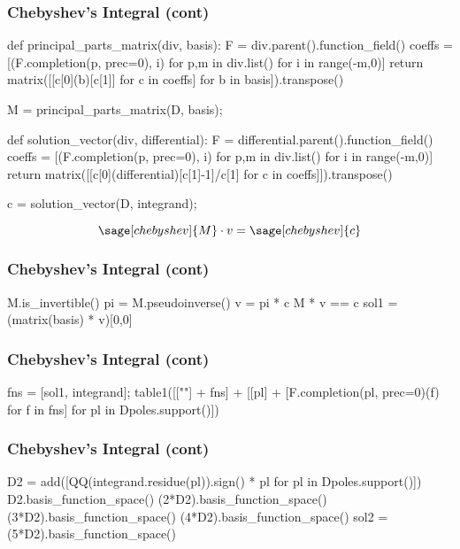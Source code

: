 \documentclass[aspectratio=169,dvipsnames]{beamer}
\begin{document}
\begin{frame}[fragile]
\frametitle{Chebyshev's Integral (cont)}

\begin{sageblock}[chebyshev]
def principal_parts_matrix(div, basis):
    F = div.parent().function_field()
    coeffs = [(F.completion(p, prec=0), i) for p,m in div.list() for i in range(-m,0)]
    return matrix([[c[0](b)[c[1]] for c in coeffs] for b in basis]).transpose()

M = principal_parts_matrix(D, basis);

def solution_vector(div, differential):
    F = differential.parent().function_field()
    coeffs = [(F.completion(p, prec=0), i) for p,m in div.list() for i in range(-m,0)]
    return matrix([[c[0](differential)[c[1]-1]/c[1] for c in coeffs]]).transpose()

c = solution_vector(D, integrand);
\end{sageblock}

\bigskip
\tiny
\[ \sage[chebyshev]{M} \cdot v = \sage[chebyshev]{c} \]

\end{frame}

\begin{frame}[fragile]
\frametitle{Chebyshev's Integral (cont)}

\begin{sageblock}[chebyshev]
M.is_invertible()
pi = M.pseudoinverse()
v = pi * c
M * v == c
sol1 = (matrix(basis) * v)[0,0]
\end{sageblock}

\end{frame}

\begin{frame}[fragile]
\frametitle{Chebyshev's Integral (cont)}

\begin{sageblock}[chebyshev]
fns = [sol1, integrand];
table1([[""] + fns] + [[pl] + [F.completion(pl, prec=0)(f) for f in fns] for pl in Dpoles.support()])
\end{sageblock}

\end{frame}

\begin{frame}[fragile]
\frametitle{Chebyshev's Integral (cont)}

\begin{sageblock}[chebyshev]
D2 = add([QQ(integrand.residue(pl)).sign() * pl for pl in Dpoles.support()])
D2.basis_function_space()
(2*D2).basis_function_space()
(3*D2).basis_function_space()
(4*D2).basis_function_space()
sol2 = (5*D2).basis_function_space()
\end{sageblock}

\end{frame}
\end{document}
